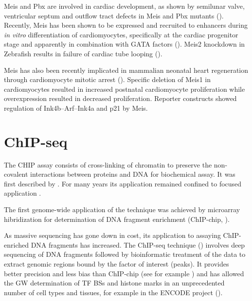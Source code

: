 Meis and Pbx are involved in cardiac development, as shown by semilunar valve, ventricular septum and outflow tract defects in Meis and Pbx mutants (\cite{Stankunas2008}). Recently, Meis has been shown to be expressed and recruited to enhancers during \textit{in vitro} differentiation of cardiomyocytes, specifically at the cardiac progenitor stage and apparently in combination with GATA factors (\cite{Wamstad2012}). Meis2 knockdown in Zebrafish results in failure of cardiac tube looping (\cite{Paige2012}). 

Meis has also been recently implicated in mammalian neonatal heart regeneration through cardiomyocyte mitotic arrest (\cite{Mahmoud2013}). Specific deletion of Meis1 in cardiomyocytes resulted in increased postnatal cardiomyocyte proliferation while overexpression resulted in decreased proliferation. Reporter constructs showed regulation of Ink4b–Arf–Ink4a and p21 by Meis.


\section{ChIP-seq}


The \ac{CHIP} assay consists of cross-linking of chromatin to preserve the non-covalent interactions between proteins and DNA for biochemical assay. It was first described by \textcite{Solomon1988}. For many years its application remained confined to focused application \parencite{Mardis2007}.

The first genome-wide application of the technique was achieved by microarray hibridization for determination of DNA fragment enrichment (ChIP-chip, \cite{Ren2000}). 

As massive sequencing has gone down in cost, its application to assaying ChIP-enriched DNA fragments has increased. The ChIP-seq technique (\cite{Robertson2007}) involves deep sequencing of DNA fragments followed by bioinformatic treatment of the data to extract genomic regions bound by the factor of interest (peaks). It provides better precision and less bias than ChIP-chip (see for example \cite{Rhee2011}) and has allowed the \ac{GW} determination of \ac{TF} \acp{BS} and histone  marks in an unprecedented number of cell types and tissues, for example in the ENCODE project (\cite{2004, 2007, 2012}).




